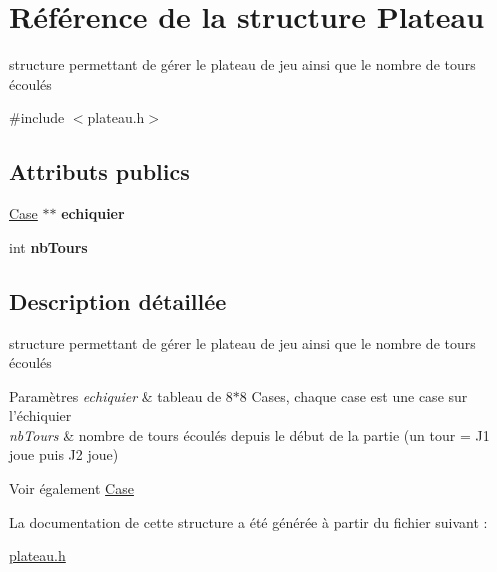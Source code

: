 \hypertarget{struct_plateau}{\section{Référence de la structure Plateau}
\label{struct_plateau}
}


structure permettant de gérer le plateau de jeu ainsi que le nombre de tours écoulés  




{\ttfamily \#include $<$plateau.\-h$>$}

\subsection*{Attributs publics}
\begin{DoxyCompactItemize}
\item 
\hypertarget{struct_plateau_a3c4a0f10da522f15247a163f33424add}{\hyperlink{struct_case}{Case} $\ast$$\ast$ {\bfseries echiquier}}\label{struct_plateau_a3c4a0f10da522f15247a163f33424add}

\item 
\hypertarget{struct_plateau_acec19558edfaaacb8d040193c5839169}{int {\bfseries nb\-Tours}}\label{struct_plateau_acec19558edfaaacb8d040193c5839169}

\end{DoxyCompactItemize}


\subsection{Description détaillée}
structure permettant de gérer le plateau de jeu ainsi que le nombre de tours écoulés 


\begin{DoxyParams}{Paramètres}
{\em echiquier} & tableau de 8$\ast$8 Cases, chaque case est une case sur l'échiquier \\
\hline
{\em nb\-Tours} & nombre de tours écoulés depuis le début de la partie (un tour = J1 joue puis J2 joue) \\
\hline
\end{DoxyParams}
\begin{DoxySeeAlso}{Voir également}
\hyperlink{struct_case}{Case} 
\end{DoxySeeAlso}


La documentation de cette structure a été générée à partir du fichier suivant \-:\begin{DoxyCompactItemize}
\item 
\hyperlink{plateau_8h}{plateau.\-h}\end{DoxyCompactItemize}
